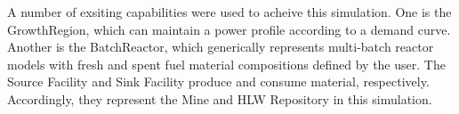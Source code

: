 
A number of exsiting capabilities were used to acheive this simulation. One is 
the GrowthRegion, which can maintain a power profile according to a demand 
curve. Another is the BatchReactor, which generically represents multi-batch reactor 
models with fresh and spent fuel material compositions defined by the user. The 
Source Facility and Sink Facility produce and consume material, respectively. 
Accordingly, they represent the Mine and HLW Repository in this simulation.  
